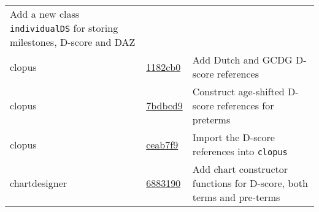 \documentclass[]{book}
\begin{document}
\begin{longtable}[]{@{}lll@{}}
\begin{minipage}[t]{0.36\columnwidth}
Add a new class \texttt{individualDS} for storing milestones, D-score and DAZ\strut
\end{minipage}\tabularnewline
\begin{minipage}[t]{0.26\columnwidth}\raggedright
clopus\strut
\end{minipage} & \begin{minipage}[t]{0.29\columnwidth}\raggedright
\href{https://github.com/stefvanbuuren/clopus/commit/1182cb02508a3207c0c9bcb35232851c38d24179}{1182cb0}\strut
\end{minipage} & \begin{minipage}[t]{0.36\columnwidth}\raggedright
Add Dutch and GCDG D-score references\strut
\end{minipage}\tabularnewline
\begin{minipage}[t]{0.26\columnwidth}\raggedright
clopus\strut
\end{minipage} & \begin{minipage}[t]{0.29\columnwidth}\raggedright
\href{https://github.com/stefvanbuuren/clopus/commit/7bdbcd9629bb215f466bbc2e2f886b6f16c5b5e9}{7bdbcd9}\strut
\end{minipage} & \begin{minipage}[t]{0.36\columnwidth}\raggedright
Construct age-shifted D-score references for preterms\strut
\end{minipage}\tabularnewline
\begin{minipage}[t]{0.26\columnwidth}\raggedright
clopus\strut
\end{minipage} & \begin{minipage}[t]{0.29\columnwidth}\raggedright
\href{https://github.com/stefvanbuuren/clopus/commit/ceab7f9547b9ae843a97b640d920ea0c36185053}{ceab7f9}\strut
\end{minipage} & \begin{minipage}[t]{0.36\columnwidth}\raggedright
Import the D-score references into \texttt{clopus}\strut
\end{minipage}\tabularnewline
\begin{minipage}[t]{0.26\columnwidth}\raggedright
chartdesigner\strut
\end{minipage} & \begin{minipage}[t]{0.29\columnwidth}\raggedright
\href{https://github.com/stefvanbuuren/chartdesigner/commit/68831906cef5cdca0d8851b057a01cc8be4fff6d}{6883190}\strut
\end{minipage} & \begin{minipage}[t]{0.36\columnwidth}\raggedright
Add chart constructor functions for D-score, both terms and pre-terms\strut

\end{minipage}
\end{longtable}
\end{document}
